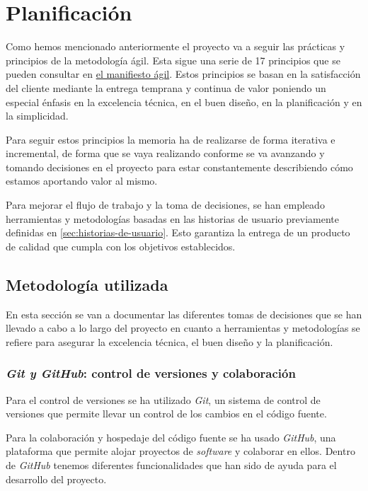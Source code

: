 \chapter{Planificación}

Como hemos mencionado anteriormente el proyecto va a seguir las prácticas y principios de la metodología ágil. Esta sigue una serie de 17 principios que se pueden consultar en \href{https://agilemanifesto.org/iso/es/manifesto.html}{el manifiesto ágil}. Estos principios se basan en la satisfacción del cliente mediante la entrega temprana y continua de valor poniendo un especial énfasis en la excelencia técnica, en el buen diseño, en la planificación y en la simplicidad.

Para seguir estos principios la memoria ha de realizarse de forma iterativa e incremental, de forma que se vaya realizando conforme se va avanzando y tomando decisiones en el proyecto para estar constantemente describiendo cómo estamos aportando valor al mismo.

Para mejorar el flujo de trabajo y la toma de decisiones, se han empleado herramientas y metodologías basadas en las historias de usuario previamente definidas en \ref{sec:historias-de-usuario}. Esto garantiza la entrega de un producto de calidad que cumpla con los objetivos establecidos.

\section{Metodología utilizada}

En esta sección se van a documentar las diferentes tomas de decisiones que se han llevado a cabo a lo largo del proyecto en cuanto a herramientas y metodologías se refiere para asegurar la excelencia técnica, el buen diseño y la planificación.

\subsection{\textit{Git y GitHub}: control de versiones y colaboración}

Para el control de versiones se ha utilizado \textit{Git}, un sistema de control de versiones que permite llevar un control de los cambios en el código fuente.

Para la colaboración y hospedaje del código fuente se ha usado \textit{GitHub}, una plataforma que permite alojar proyectos de \textit{software} y colaborar en ellos. Dentro de \textit{GitHub} tenemos diferentes funcionalidades que han sido de ayuda para el desarrollo del proyecto.

